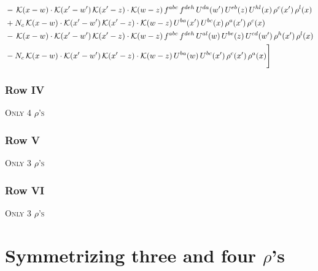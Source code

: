 \documentclass[9pt]{article}
\numberwithin{equation}{section}
\begin{document}
\begin{align}
&-\,\mathcal{K}(x-w)\cdot\mathcal{K}(x'-w')\,\mathcal{K}(x'-z)\cdot\mathcal{K}(w-z)\,f^{abc}\,f^{deh}\,U^{da}(w')\,U^{eb}(z)\,U^{hl}(x)\,\rho^{c}(x')\,\rho^{l}(x)\notag\\
&+N_{c}\,\mathcal{K}(x-w)\cdot\mathcal{K}(x'-w')\,\mathcal{K}(x'-z)\cdot\mathcal{K}(w-z)\,U^{ba}(x')\,U^{bc}(x)\,\rho^{a}(x')\,\rho^{c}(x)\notag\\
&-\,\mathcal{K}(x-w)\cdot\mathcal{K}(x'-w')\,\mathcal{K}(x'-z)\cdot\mathcal{K}(w-z)\,f^{abc}\,f^{deh}\,U^{al}(w)\,U^{be}(z)\,U^{cd}(w')\,\rho^{h}(x')\,\rho^{l}(x)\notag\\
&-N_{c}\,\mathcal{K}(x-w)\cdot\mathcal{K}(x'-w')\,\mathcal{K}(x'-z)\cdot\mathcal{K}(w-z)\,U^{ba}(w)\,U^{bc}(x')\,\rho^{c}(x')\,\rho^{a}(x)\Bigg]
\end{align}
\subsubsection{Row IV}
\textsc{Only 4 $\rho$'s}
\subsubsection{Row V}
\textsc{Only 3 $\rho$'s}
\subsubsection{Row VI}
\textsc{Only 3 $\rho$'s}
\section{Symmetrizing three and four $\rho$'s}
\end{document}
